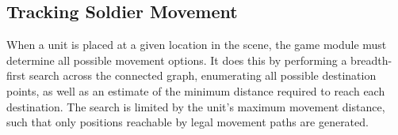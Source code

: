 \documentclass[review]{vgtc}                 %
\begin{document}



\subsection{Tracking Soldier Movement }

When a unit is placed at a given location in the scene, the game
module must determine all possible movement options.  It does this by
performing a breadth-first search across the connected graph,
enumerating all possible destination points, as well as an estimate of
the minimum distance required to reach each destination.  The search
is limited by the unit's maximum movement distance, such that only
positions reachable by legal movement paths are generated.  
\end{document}
